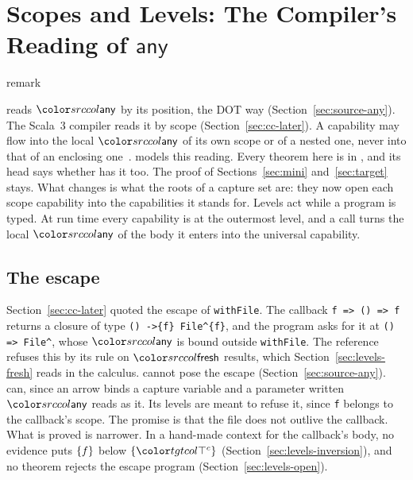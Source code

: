 \section{Scopes and Levels: The Compiler's Reading of \texorpdfstring{$\mathsf{any}$}{any}}\label{sec:levels}

\providecommand{\elej}[4]{\tgt{#1 \vdash_{\!e} #2 : #3 \le #4}}
\providecommand{\lamcc}[6]{\lambda^{#1}_{#2}(#3 : #4).\,#5\;\ann{#6}}
\providecommand{\frletex}[6]{\klet \langle #1, #2\rangle.\,#3\;\ann{#4;\,#5;\,#6}}
\providecommand{\appE}[2]{#1 \mathbin{\triangleleft} #2}
\providecommand{\ent}[1]{\mathit{ent}_{#1}}
\ifcsname remark\endcsname\else
  \theoremstyle{acmdefinition}\newtheorem{remark}[theorem]{Remark}
\fi

\mathtgt

\treeK reads $\cany$ by its position, the DOT way (Section~\ref{sec:source-any}). The Scala~3 compiler reads it by scope (Section~\ref{sec:cc-later}). A capability may flow into the local $\cany$ of its own scope or of a nested one, never into that of an enclosing one~\cite{scala3cc}. \treeCC models this reading. Every theorem here is in \treeCC, and its head says whether \treeCL has it too. The proof of Sections~\ref{sec:mini} and~\ref{sec:target} stays. What changes is what the roots of a capture set are: they now open each scope capability into the capabilities it stands for. Levels act while a program is typed. At run time every capability is at the outermost level, and a call turns the local $\cany$ of the body it enters into the universal capability.

\subsection{The escape}\label{sec:levels-program}

Section~\ref{sec:cc-later} quoted the escape of \lstinline{withFile}. The callback \lstinline|f => () => f| returns a closure of type \lstinline|() ->{f} File^{f}|, and the program asks for it at \lstinline|() => File^|, whose $\cany$ is bound outside \lstinline{withFile}. The reference refuses this by its rule on $\cfresh$ results, which Section~\ref{sec:levels-fresh} reads in the calculus. \treeK cannot pose the escape (Section~\ref{sec:source-any}). \treeCC can, since an arrow binds a capture variable and a parameter written $\cany$ reads as it. Its levels are meant to refuse it, since \lstinline{f} belongs to the callback's scope. The promise is that the file does not outlive the callback. What is proved is narrower. In a hand-made context for the callback's body, no evidence puts $\{f\}$ below $\cset{\topc}$ (Section~\ref{sec:levels-inversion}), and no theorem rejects the escape program (Section~\ref{sec:levels-open}).

